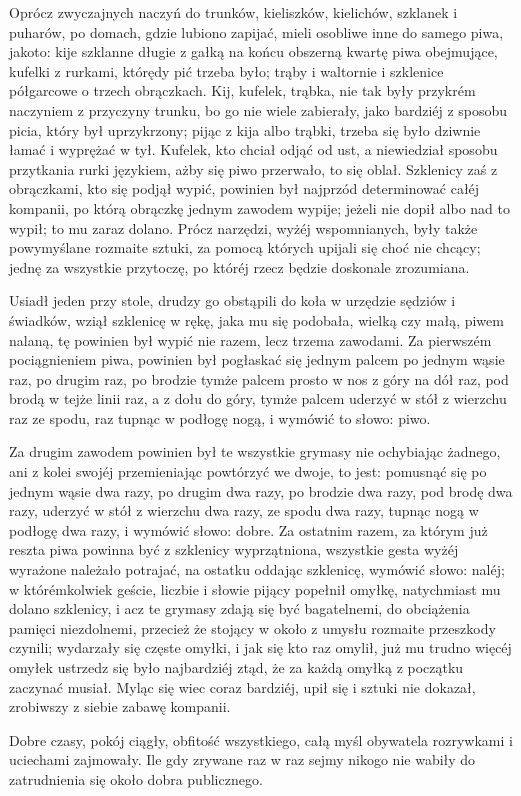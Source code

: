 \documentclass{book}
\begin{document}
Oprócz zwyczajnych naczyń do trunków, kieliszków, kielichów, szklanek i puharów, po domach, gdzie lubiono zapijać, mieli osobliwe inne do samego piwa, jakoto: kije szklanne długie z gałką na końcu obszerną kwartę piwa obejmujące, kufelki z rurkami, którędy pić trzeba było; trąby i waltornie i szklenice półgarcowe o trzech obrączkach. Kij, kufelek, trąbka, nie tak były przykrém naczyniem z przyczyny trunku, bo go nie wiele zabierały, jako bardziéj z sposobu picia, który był uprzykrzony; pijąc z kija albo trąbki, trzeba się było dziwnie łamać i wyprężać w tył. Kufelek, kto chciał odjąć od ust, a niewiedział sposobu przytkania rurki językiem, ażby się piwo przerwało, to się oblał. Szklenicy zaś z obrączkami, kto się podjął wypić, powinien był najprzód determinować całéj kompanii, po którą obrączkę jednym zawodem wypije; jeżeli nie dopił albo nad to wypił; to mu zaraz dolano. Prócz narzędzi, wyżéj wspomnianych, były także powymyślane rozmaite sztuki, za pomocą których upijali się choć nie chcący; jednę za wszystkie przytoczę, po któréj rzecz będzie doskonale zrozumiana.

Usiadł jeden przy stole, drudzy go obstąpili do koła w urzędzie sędziów i świadków, wziął szklenicę w rękę, jaka mu się podobała, wielką czy małą, piwem nalaną, tę powinien był wypić nie razem, lecz trzema zawodami. Za pierwszém pociągnieniem piwa, powinien był pogłaskać się jednym palcem po jednym wąsie raz, po drugim raz, po brodzie tymże palcem prosto w nos z góry na dół raz, pod brodą w tejże linii raz, a z dołu do góry, tymże palcem uderzyć w stół z wierzchu raz ze spodu, raz tupnąc w podłogę nogą, i wymówić to słowo: piwo.

Za drugim zawodem powinien był te wszystkie grymasy nie ochybiając żadnego, ani z kolei swojéj przemieniając powtórzyć we dwoje, to jest: pomusnąć się po jednym wąsie dwa razy, po drugim dwa razy, po brodzie dwa razy, pod brodę dwa razy, uderzyć w stół z wierzchu dwa razy, ze spodu dwa razy, tupnąc nogą w podłogę dwa razy, i wymówić słowo: dobre. Za ostatnim razem, za którym już reszta piwa powinna być z szklenicy wyprzątniona, wszystkie gesta wyżéj wyrażone należało potrajać, na ostatku oddając szklenicę, wymówić słowo: naléj; w którémkolwiek geście, liczbie i słowie pijący popełnił omyłkę, natychmiast mu dolano szklenicy, i acz te grymasy zdają się być bagatelnemi, do obciążenia pamięci niezdolnemi, przecież że stojący w około z umysłu rozmaite przeszkody czynili; wydarzały się częste omyłki, i jak się kto raz omylił, już mu trudno więcéj omyłek ustrzedz się było najbardziéj ztąd, że za każdą omyłką z początku zaczynać musiał. Myląc się wiec coraz bardziéj, upił się i sztuki nie dokazał, zrobiwszy z siebie zabawę kompanii.

Dobre czasy, pokój ciągły, obfitość wszystkiego, całą myśl obywatela rozrywkami i uciechami zajmowały. Ile gdy zrywane raz w raz sejmy nikogo nie wabiły do zatrudnienia się około dobra publicznego.


\listoftables   

\listoffigures
  
\end{document}
